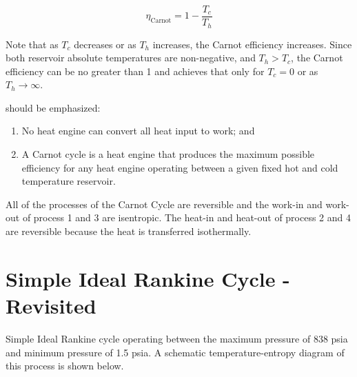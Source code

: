 $$ \eta_{\text{Carnot}} = 1 - \frac{T_c}{T_h}$$ 

Note that as $T_c$ decreases or as $T_h$ increases, the Carnot efficiency increases.  Since both reservoir absolute temperatures are non-negative, and $T_h > T_c$, the Carnot efficiency can be no greater than 1 and achieves that only for $T_c=0$ or as $T_h \rightarrow \infty$.  

 should be emphasized:
\begin{enumerate}
\item No heat engine can convert all heat input to work; and
\item A Carnot cycle is a heat engine that produces the maximum possible efficiency for any heat engine operating between a given fixed hot and cold temperature reservoir.
\end{enumerate}

All of the processes of the Carnot Cycle are reversible and the work-in and work-out of process 1 and 3 are isentropic.  The heat-in and heat-out of process 2 and 4 are reversible because the heat is transferred isothermally.

\section{Simple Ideal Rankine Cycle - Revisited}
 Simple Ideal Rankine cycle operating between the maximum pressure of 838 psia and minimum pressure of 1.5 psia.  A schematic temperature-entropy diagram of this process is shown below.

